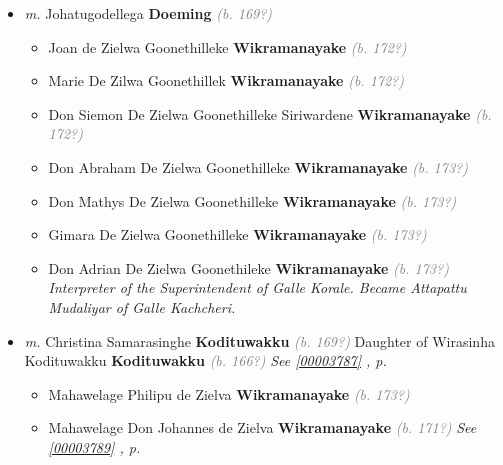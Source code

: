 \documentclass[10pt, openany]{book}
\begin{document}
\begin{itemize}
\item{\textit{m.} Johatugodellega \textbf{Doeming} \textcolor{gray}{\textit{(b. 169?)}}   \label{couple:00003772:00003773} \begin{itemize}
\item{Joan de Zielwa Goonethilleke \textbf{Wikramanayake} \textcolor{gray}{\textit{(b. 172?)}}
    }
\item{Marie De Zilwa Goonethillek \textbf{Wikramanayake} \textcolor{gray}{\textit{(b. 172?)}}
    }
\item{Don Siemon De Zielwa Goonethilleke Siriwardene \textbf{Wikramanayake} \textcolor{gray}{\textit{(b. 172?)}}
      }
\item{Don Abraham De Zielwa Goonethilleke \textbf{Wikramanayake} \textcolor{gray}{\textit{(b. 173?)}}
     }
\item{Don Mathys De Zielwa Goonethilleke \textbf{Wikramanayake} \textcolor{gray}{\textit{(b. 173?)}}
     }
\item{Gimara De Zielwa Goonethilleke \textbf{Wikramanayake} \textcolor{gray}{\textit{(b. 173?)}}
    }
\item{Don Adrian De Zielwa Goonethileke \textbf{Wikramanayake} \textcolor{gray}{\textit{(b. 173?)}} \textcolor{slmaroon}{\textit{Interpreter of the Superintendent of Galle Korale. Became Attapattu Mudaliyar of Galle Kachcheri.}}
     }
\end{itemize}}
\item{\textit{m.} Christina Samarasinghe \textbf{Kodituwakku} \textcolor{gray}{\textit{(b. 169?)}} Daughter of  Wirasinha Kodituwakku \textbf{Kodituwakku} \textcolor{gray}{\textit{(b. 166?)}} \textcolor{slteal}{\textit{See  \autoref{00003787} \textit{, p. \pageref{00003787} }}}   \label{couple:00003772:00003786} \begin{itemize}
\item{Mahawelage Philipu de Zielva \textbf{Wikramanayake} \textcolor{gray}{\textit{(b. 173?)}}
    }
\item{Mahawelage Don Johannes de Zielva \textbf{Wikramanayake} \textcolor{gray}{\textit{(b. 171?)}} \textcolor{slteal}{\textit{See  \autoref{00003789} \textit{, p. \pageref{00003789} }}}}
\end{itemize}}
\end{itemize}
    
\end{document}

